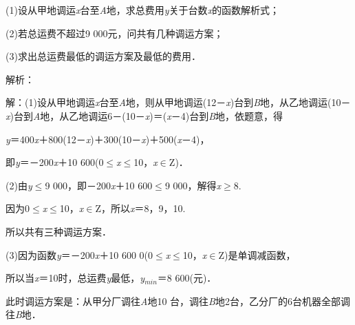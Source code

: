 \documentclass{article} %
\begin{document}
(1)设从甲地调运\textit{x}台至\textit{A}地，求总费用\textit{y}关于台数\textit{x}的函数解析式；

(2)若总运费不超过9 000元，问共有几种调运方案；

(3)求出总运费最低的调运方案及最低的费用．

解析：

解：(1)设从甲地调运\textit{x}台至\textit{A}地，则从甲地调运(12－\textit{x})台到\textit{B}地，从乙地调运(10－\textit{x})台到\textit{A}地，从乙地调运6－(10－\textit{x})＝(\textit{x}－4)台到\textit{B}地，依题意，得

\textit{y}＝400\textit{x}＋800(12－\textit{x})＋300(10－\textit{x})＋500(\textit{x}－4)，

即\textit{y}＝－200\textit{x}＋10 600(0$\mathrm{\le}$\textit{x}$\mathrm{\le}$10，\textit{x}$\mathrm{\in}$Z)．

(2)由\textit{y}$\mathrm{\le}$9 000，即－200\textit{x}＋10 600$\mathrm{\le}$9 000，解得\textit{x}$\mathrm{\ge}$8.

因为0$\mathrm{\le}$\textit{x}$\mathrm{\le}$10，\textit{x}$\mathrm{\in}$Z，所以\textit{x}＝8，9，10.

所以共有三种调运方案．

(3)因为函数\textit{y}＝－200\textit{x}＋10 600 0(0$\mathrm{\le}$\textit{x}$\mathrm{\le}$10，\textit{x}$\mathrm{\in}$Z)是单调减函数，

所以当\textit{x}＝10时，总运费\textit{y}最低，\textit{y}${}_{min}$＝8 600(元)．

此时调运方案是：从甲分厂调往\textit{A}地10 台，调往\textit{B}地2台，乙分厂的6台机器全部调往\textit{B}地．
\end{document}
